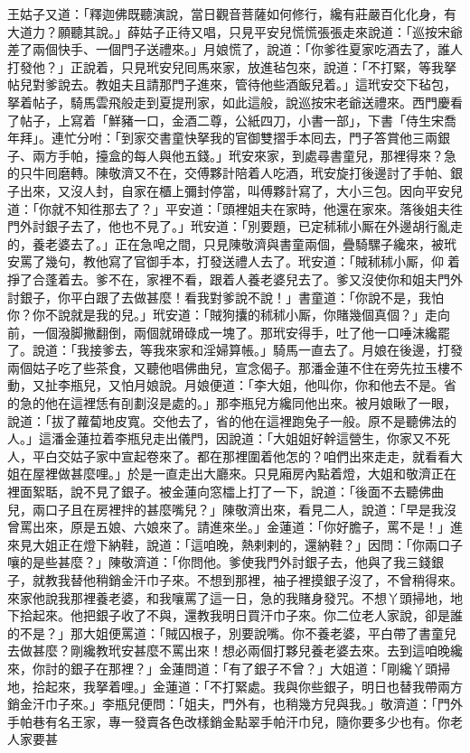 王姑子又道：「釋迦佛既聽演說，當日觀音菩薩如何修行，纔有莊嚴百化化身，有大道力？願聽其說。」薛姑子正待又唱，只見平安兒慌慌張張走來說道：「巡按宋爺差了兩個快手、一個門子送禮來。」月娘慌了，說道：「你爹徃夏家吃酒去了，誰人打發他？」正說着，只見玳安兒囘馬來家，放進毡包來，說道：「不打緊，等我拏帖兒對爹說去。教姐夫且請那門子進來，管待他些酒飯兒着。」{}這玳安交下毡包，拏着帖子，騎馬雲飛般走到夏提刑家，如此這般，說巡按宋老爺送禮來。西門慶看了帖子，上寫着「鮮豬一口，金酒二尊，公紙四刀，小書一部」，下書「侍生宋喬年拜」。連忙分咐：「到家交書童快拏我的官御雙摺手本囘去，門子答賞他三兩銀子、兩方手帕，擡盒的每人與他五錢。」玳安來家，到處尋書童兒，那裡得來？急的只牛囘磨轉。陳敬濟又不在，交傅夥計陪着人吃酒，玳安旋打後邊討了手帕、銀子出來，又沒人封，自家在櫃上彌封停當，叫傅夥計寫了，大小三包。因向平安兒道：「你就不知徃那去了？」平安道：「頭裡姐夫在家時，他還在家來。落後姐夫徃門外討銀子去了，他也不見了。」玳安道：「別要題，已定秫秫小厮在外邊胡行亂走的，養老婆去了。」正在急唣之間，只見陳敬濟與書童兩個，疊騎騾子纔來，被玳安罵了幾句，教他寫了官御手本，打發送禮人去了。玳安道：「賊秫秫小厮，仰𢵞着掙了合蓬着去。{}爹不在，家裡不看，跟着人養老婆兒去了。爹又沒使你和姐夫門外討銀子，你平白跟了去做甚麼！看我對爹說不說！」書童道：「你說不是，我怕你？你不說就是我的兒。」{}玳安道：「賊狗攮的秫秫小厮，你賭幾個真個？」走向前，一個潑脚撇翻倒，兩個就磆碌成一塊了。那玳安得手，吐了他一口唾沫纔罷了。說道：「我接爹去，等我來家和淫婦算帳。」騎馬一直去了。月娘在後邊，打發兩個姑子吃了些茶食，又聽他唱佛曲兒，宣念偈子。那潘金蓮不住在旁先拉玉樓不動，又扯李瓶兒，又怕月娘說。月娘便道：「李大姐，他叫你，你和他去不是。省的急的他在這裡恁有㓦劃沒是處的。」那李瓶兒方纔同他出來。被月娘瞅了一眼，說道：「拔了蘿蔔地皮寬。交他去了，省的他在這裡跑兔子一般。原不是聽佛法的人。」{}這潘金蓮拉着李瓶兒走出儀門，因說道：「大姐姐好幹這營生，你家又不死人，平白交姑子家中宣起卷來了。都在那裡圍着他怎的？咱們出來走走，就看看大姐在屋裡做甚麼哩。」於是一直走出大廳來。只見廂房內點着燈，大姐和敬濟正在裡面絮聒，說不見了銀子。被金蓮向窓櫺上打了一下，說道：「後面不去聽佛曲兒，兩口子且在房裡拌的甚麼嘴兒？」陳敬濟出來，看見二人，說道：「早是我沒曾罵出來，原是五娘、六娘來了。請進來坐。」金蓮道：「你好膽子，罵不是！」進來見大姐正在燈下納鞋，說道：「這咱晚，熱剌剌的，還納鞋？」因問：「你兩口子嚷的是些甚麼？」陳敬濟道：「你問他。爹使我門外討銀子去，他與了我三錢銀子，就教我替他稍銷金汗巾子來。不想到那裡，袖子裡摸銀子沒了，不曾稍得來。來家他說我那裡養老婆，和我嚷罵了這一日，急的我賭身發咒。不想丫頭掃地，地下拾起來。他把銀子收了不與，還教我明日買汗巾子來。{}你二位老人家說，卻是誰的不是？」那大姐便罵道：「賊囚根子，別要說嘴。你不養老婆，平白帶了書童兒去做甚麼？剛纔教玳安甚麼不罵出來！想必兩個打夥兒養老婆去來。去到這咱晚纔來，你討的銀子在那裡？」金蓮問道：「有了銀子不曾？」大姐道：「剛纔丫頭掃地，拾起來，我拏着哩。」金蓮道：「不打緊處。我與你些銀子，明日也替我帶兩方銷金汗巾子來。」李瓶兒便問：「姐夫，門外有，也稍幾方兒與我。」敬濟道：「門外手帕巷有名王家，專一發賣各色改樣銷金點翠手帕汗巾兒，隨你要多少也有。你老人家要甚